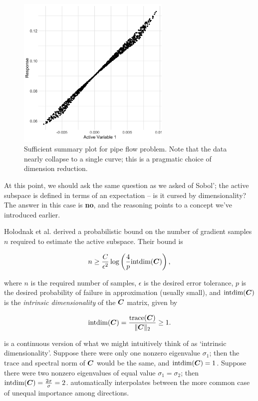 \documentclass{article}
\begin{document}
\begin{figure}[!ht]
  \centering
  \includegraphics[width=0.65\textwidth]{../../images/as_summary_nat}
  \caption{Sufficient summary plot for pipe flow problem. Note that the data
    nearly collapse to a single curve; this is a pragmatic choice of dimension
    reduction.}
  \label{fig:as-pipe-summary-nat}
\end{figure}
\clearpage

At this point, we should ask the same question as we asked of Sobol'; the active
subspace is defined in terms of an expectation -- is it cursed by
dimensionality? The answer in this case is \textbf{no}, and the reasoning points
to a concept we've introduced earlier.

Holodnak et al.\cite{holodnak2018probabilistic} derived a probabilistic bound on
the number of gradient samples $n$ required to estimate the active subspace.
Their bound is

\begin{equation}
  n \geq \frac{C}{\epsilon^2}\log\left(\frac{4}{p}\text{intdim}(\boldsymbol{C})\right),
\end{equation}

\noindent where $n$ is the required number of samples, $\epsilon$ is the desired
error tolerance, $p$ is the desired probability of failure in approximation
(usually small), and $\text{intdim}(\boldsymbol{C})$ is the \emph{intrinsic dimensionality}
of the $\boldsymbol{C}$ matrix, given by

\begin{equation} \label{eq:int-dim}
  \text{intdim}(\boldsymbol{C}) = \frac{\text{trace}(\boldsymbol{C})}{\|\boldsymbol{C}\|_2} \geq 1.
\end{equation}

\noindent {} is a continuous version of what we might intuitively
think of as `intrinsic dimensionality'. Suppose there were only one nonzero
eigenvalue $\sigma_1$; then the trace and spectral norm of $\boldsymbol{C}$ would be the
same, and $\text{intdim}(\boldsymbol{C})=1$. Suppose there were two nonzero eigenvalues of
equal value $\sigma_1=\sigma_2$; then
$\text{intdim}(\boldsymbol{C})=\frac{2\sigma}{\sigma}=2$.  automatically
interpolates between the more common case of unequal importance among
directions.
\end{document}
